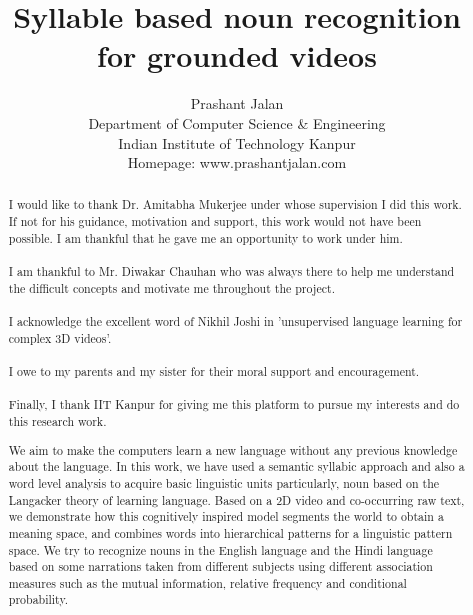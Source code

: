 \documentclass[12pt, a4paper]{report}
\begin{document}
\title{Syllable based noun recognition\\for grounded videos}
\author{Prashant Jalan
\\Department of Computer Science \& Engineering\\
Indian Institute of Technology Kanpur\\
Homepage: www.prashantjalan.com}

\maketitle
\tableofcontents

\renewcommand{\abstractname}{Acknowledgements}
\begin{abstract}
I would like to thank Dr. Amitabha Mukerjee under whose supervision I did this work. If not for his guidance, motivation and support, this work would not have been possible. I am thankful that he gave me an opportunity to work under him.\\
\\
I am thankful to Mr. Diwakar Chauhan who was always there to help me understand the difficult concepts and motivate me throughout the project.\\
\\
I acknowledge the excellent word of Nikhil Joshi in 'unsupervised language learning for complex 3D videos'.\\
\\
I owe to my parents and my sister for their moral support and encouragement.\\
\\
Finally, I thank IIT Kanpur for giving me this platform to pursue my interests and do this research work.



\end{abstract}

\renewcommand{\abstractname}{Abstract}
\begin{abstract}
We aim to make the computers learn a new language without any previous knowledge about the language. In this work, we have used a semantic syllabic approach and also a word level analysis to acquire basic linguistic units particularly, noun based on the Langacker\cite{} theory of learning language. Based on a 2D video and co-occurring raw text, we demonstrate how this cognitively inspired model segments the world to obtain a meaning space, and combines words into hierarchical patterns for a linguistic pattern space. We try to recognize nouns in the English language and the Hindi language based on some narrations taken from different subjects using different association measures such as the mutual information, relative frequency and conditional probability.
\end{abstract}
\end{document}
